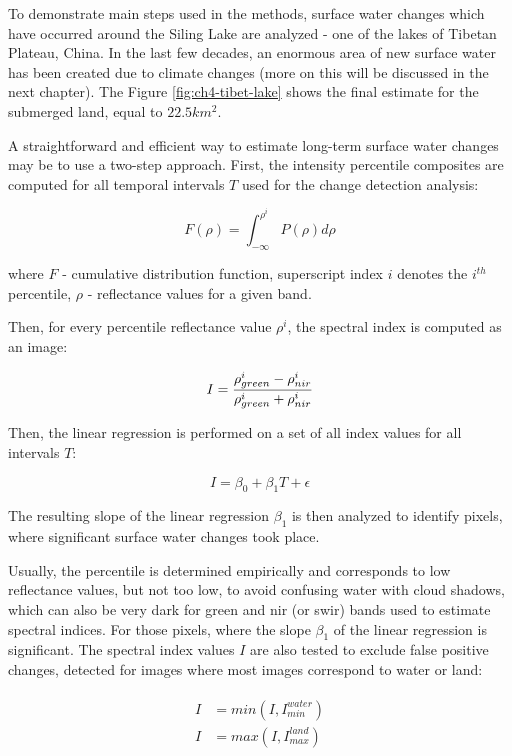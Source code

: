 To demonstrate main steps used in the methods, surface water changes which have occurred around the Siling Lake are analyzed - one of the lakes of Tibetan Plateau, China. In the last few decades, an enormous area of new surface water has been created due to climate changes (more on this will be discussed in the next chapter). The Figure \ref{fig:ch4-tibet-lake} shows the final estimate for the submerged land, equal to $22.5 km^2$. 

A straightforward and efficient way to estimate long-term surface water changes may be to use a two-step approach. First, the intensity percentile composites are computed for all temporal intervals $T$ used for the change detection analysis:

\begin{equation}
F(\rho) = \int_{-\infty}^{\rho^i} P(\rho)d\rho
\end{equation}

where $F$ - cumulative distribution function, superscript index $i$ denotes the $i^{th}$ percentile, $\rho$ - reflectance values for a given band.

Then, for every percentile reflectance value $\rho^i$, the spectral index is computed as an image:

\begin{equation}
I = \frac{\rho_{green}^i-\rho_{nir}^i}{\rho_{green}^i+\rho_{nir}^i} \\
\end{equation}

Then, the linear regression is performed on a set of all index values for all intervals $T$:

\begin{equation}
I = \beta_0 + \beta_1 T + \epsilon
\end{equation}

The resulting slope of the linear regression $\beta_1$ is then analyzed to identify pixels, where significant surface water changes took place. 

Usually, the percentile is determined empirically and corresponds to low reflectance values, but not too low, to avoid confusing water with cloud shadows, which can also be very dark for green and nir (or swir) bands used to estimate spectral indices. For those pixels, where the slope $\beta_1$ of the linear regression is significant. The spectral index values $I$ are also tested to exclude false positive changes, detected for images where most images correspond to water or land:

\begin{equation}
\begin{split}
\begin{aligned}
I &= min\left(I, I_{min}^{water}\right) \\
I &= max\left(I, I_{max}^{land}\right) 
\end{aligned}
\end{split}
\label{eq:water-land-suppression}
\end{equation}

